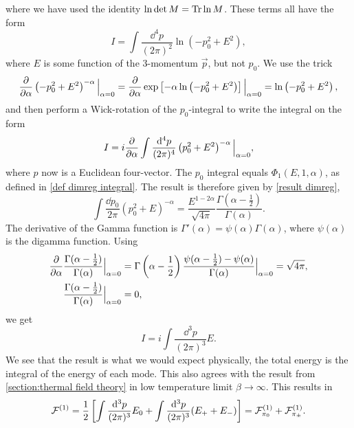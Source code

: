 where we have used the identity $\ln\det M = \Tr \ln M $.
These terms all have the form
\begin{equation}
    \label{free energy logarithmic integral}
    I = \int \frac{\dd^4 p}{(2 \pi)^2} \ln(-p_0^2 + E^2),
\end{equation}
where $E$ is some function of the 3-momentum $\vec p$, but not $p_0$.
We use the trick
\begin{equation}
    \pdv{\alpha} \left(-p_0^2 + E^2\right)^{-\alpha} \Big|_{\alpha=0}
    = \pdv{\alpha} \exp\left[ -\alpha \ln\left(- p_0^2 + E^2\right)  \right] \Big|_{\alpha=0}
    = \ln\left(- p_0^2 + E^2\right),
\end{equation}
and then perform a Wick-rotation of the $p_0$-integral to write the integral on the form 
\begin{equation}
    I = i \pdv{\alpha} \int \frac{\dd^4 p}{(2 \pi)^4} \left(p_0^2 + E^2\right)^{-\alpha} \Big|_{\alpha=0},
\end{equation}
where $p$ now is a Euclidean four-vector.
The $p_0$ integral equals $\Phi_1(E, 1, \alpha)$, as defined in \autoref{def dimreg integral}. 
The result is therefore given by \autoref{result dimreg},
\begin{equation}
    \int \frac{\dd p_0}{2 \pi} (p_0^2 + E)^{-\alpha} 
    = \frac{E^{1-2\alpha}}{\sqrt{4 \pi}} \frac{\Gamma(\alpha-\frac{1}{2})}{\Gamma(\alpha)}.
\end{equation}
The derivative of the Gamma function is $\Gamma'(\alpha) = \psi(\alpha)\Gamma(\alpha)$, where $\psi(\alpha)$ is the digamma function.
Using
\begin{align}
    \diffp{}{\alpha} & \frac{\Gamma(\alpha - \frac{1}{2}) }{\Gamma(\alpha)} \Big|_{\alpha=0}
    = \Gamma\left(\alpha - \frac{1}{2}\right) \frac{\psi(\alpha - \frac{1}{2}) - \psi(\alpha)}{\Gamma(\alpha)} \Big|_{\alpha=0}
    = \sqrt{4 \pi}, \\
    & \frac{\Gamma(\alpha - \frac{1}{2}) }{\Gamma(\alpha)}\Big|_{\alpha=0} = 0,
\end{align}
we get
\begin{equation}
    I = i \int \frac{\dd^3 p}{(2 \pi)^3} E.
\end{equation}
We see that the result is what we would expect physically, the total energy is the integral of the energy of each mode.
This also agrees with the result from \autoref{section:thermal field theory} in low temperature limit $\beta \rightarrow \infty$.
This results in 
\begin{equation}
    \mathcal{F}^{(1)} = 
    \frac{1}{2} 
    \left[\int \frac{\dd^3 p}{(2\pi)^3} E_0 + \int  \frac{\dd^3 p}{(2\pi)^3} (E_+ + E_-)\right]
    = \mathcal{F}^{(1)}_{\pi_0} +\mathcal{F}^{(1)}_{\pi_\pm}.
\end{equation}
